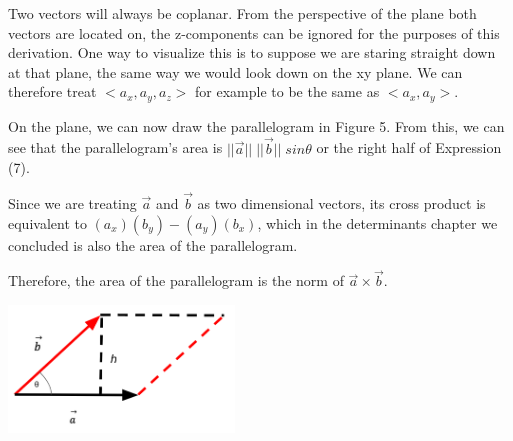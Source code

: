 \documentclass{article}
\begin{document}
\par\noindent Two vectors will always be coplanar. From the perspective of the plane both vectors are located on, the z-components can be ignored for the purposes of this derivation. One way to visualize this is to suppose we are staring straight down at that plane, the same way we would look down on the xy plane. We can therefore treat \(<a_x, a_y, a_z >\) for example to be the same as \(<a_x, a_y>\).
\newline
\newline
\begin{minipage}{.6\linewidth}
	\par\noindent On the plane, we can now draw the parallelogram in Figure 5. From this, we can see that the parallelogram's area is \( || \vec a || \; || \vec b || \; sin\theta \) or the right half of Expression (7).
	\newline
	\par\noindent Since we are treating \(\vec a\) and \(\vec b\) as two dimensional vectors, its cross product is equivalent to \((a_x)(b_y) - (a_y)(b_x)\), which in the determinants chapter we concluded is also the area of the parallelogram. 
	\newline
	\par\noindent Therefore, the area of the parallelogram is the norm of \(\vec a \times \vec b\).
\end{minipage}
\begin{minipage}[c]{.4\linewidth}
			\includegraphics[width=6cm]{cross-sine.png}	
\end{minipage}
\newpage
\end{document}

